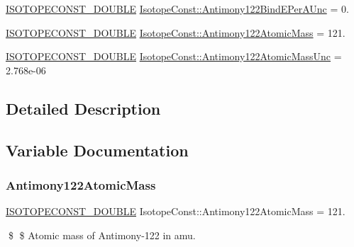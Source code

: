 \begin{DoxyCompactItemize}
\mbox{\hyperlink{group___isotope_const-_macros_ga8f45a7272ce02c0b4c65c44636ed719a}{I\+S\+O\+T\+O\+P\+E\+C\+O\+N\+S\+T\+\_\+\+D\+O\+U\+B\+LE}} \mbox{\hyperlink{group___isotope_const-_antimony-_sb122_gad12bae877be0b7effde73fad1955d4c4}{Isotope\+Const\+::\+Antimony122\+Bind\+E\+Per\+A\+Unc}} = 0.
\item 
\mbox{\hyperlink{group___isotope_const-_macros_ga8f45a7272ce02c0b4c65c44636ed719a}{I\+S\+O\+T\+O\+P\+E\+C\+O\+N\+S\+T\+\_\+\+D\+O\+U\+B\+LE}} \mbox{\hyperlink{group___isotope_const-_antimony-_sb122_ga0b7b9b3ac264467e708ac8fb16733693}{Isotope\+Const\+::\+Antimony122\+Atomic\+Mass}} = 121.
\item 
\mbox{\hyperlink{group___isotope_const-_macros_ga8f45a7272ce02c0b4c65c44636ed719a}{I\+S\+O\+T\+O\+P\+E\+C\+O\+N\+S\+T\+\_\+\+D\+O\+U\+B\+LE}} \mbox{\hyperlink{group___isotope_const-_antimony-_sb122_ga12cafeb272840e3ebc4b7de287b1bb97}{Isotope\+Const\+::\+Antimony122\+Atomic\+Mass\+Unc}} = 2.\+768e-\/06
\end{DoxyCompactItemize}


\subsection{Detailed Description}


\subsection{Variable Documentation}
\mbox{\label{group___isotope_const-_antimony-_sb122_ga0b7b9b3ac264467e708ac8fb16733693}} 
\subsubsection{\texorpdfstring{Antimony122\+Atomic\+Mass}{Antimony122AtomicMass}}
{\footnotesize\ttfamily \mbox{\hyperlink{group___isotope_const-_macros_ga8f45a7272ce02c0b4c65c44636ed719a}{I\+S\+O\+T\+O\+P\+E\+C\+O\+N\+S\+T\+\_\+\+D\+O\+U\+B\+LE}} Isotope\+Const\+::\+Antimony122\+Atomic\+Mass = 121.}

\$ \$ Atomic mass of Antimony-\/122 in amu. \mbox{\label{group___isotope_const-_antimony-_sb122_ga12cafeb272840e3ebc4b7de287b1bb97}} 
